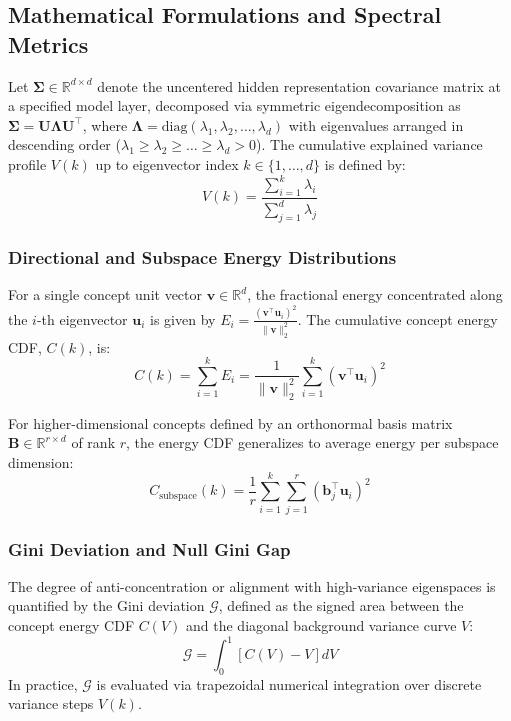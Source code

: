 \subsection{Mathematical Formulations and Spectral Metrics}
\label{sec:spectral_metrics}

Let $\mathbf{\Sigma} \in \mathbb{R}^{d \times d}$ denote the uncentered hidden representation covariance matrix at a specified model layer, decomposed via symmetric eigendecomposition as $\mathbf{\Sigma} = \mathbf{U} \mathbf{\Lambda} \mathbf{U}^\top$, where $\mathbf{\Lambda} = \text{diag}(\lambda_1, \lambda_2, \dots, \lambda_d)$ with eigenvalues arranged in descending order ($\lambda_1 \ge \lambda_2 \ge \dots \ge \lambda_d > 0$). The cumulative explained variance profile $V(k)$ up to eigenvector index $k \in \{1, \dots, d\}$ is defined by:
\begin{equation}
V(k) = \frac{\sum_{i=1}^k \lambda_i}{\sum_{j=1}^d \lambda_j}
\end{equation}

\subsubsection{Directional and Subspace Energy Distributions}
For a single concept unit vector $\mathbf{v} \in \mathbb{R}^d$, the fractional energy concentrated along the $i$-th eigenvector $\mathbf{u}_i$ is given by $E_i = \frac{(\mathbf{v}^\top \mathbf{u}_i)^2}{\|\mathbf{v}\|_2^2}$. The cumulative concept energy CDF, $C(k)$, is:
\begin{equation}
C(k) = \sum_{i=1}^k E_i = \frac{1}{\|\mathbf{v}\|_2^2} \sum_{i=1}^k \left(\mathbf{v}^\top \mathbf{u}_i\right)^2
\end{equation}

For higher-dimensional concepts defined by an orthonormal basis matrix $\mathbf{B} \in \mathbb{R}^{r \times d}$ of rank $r$, the energy CDF generalizes to average energy per subspace dimension:
\begin{equation}
C_{\text{subspace}}(k) = \frac{1}{r} \sum_{i=1}^k \sum_{j=1}^r \left(\mathbf{b}_j^\top \mathbf{u}_i\right)^2
\end{equation}

\subsubsection{Gini Deviation and Null Gini Gap}
The degree of anti-concentration or alignment with high-variance eigenspaces is quantified by the Gini deviation $\mathcal{G}$, defined as the signed area between the concept energy CDF $C(V)$ and the diagonal background variance curve $V$:
\begin{equation}
\mathcal{G} = \int_0^1 \left[ C(V) - V \right] dV
\end{equation}
In practice, $\mathcal{G}$ is evaluated via trapezoidal numerical integration over discrete variance steps $V(k)$. 

